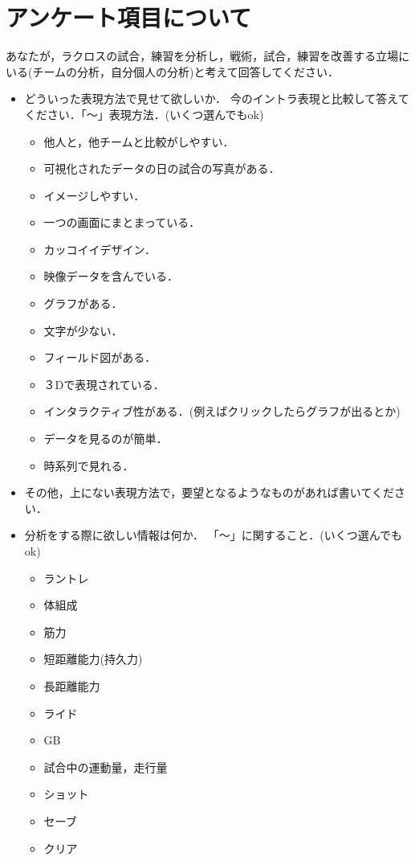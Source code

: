 \documentclass[shuuron]{kuee}
\begin{document}
\chapter{アンケート項目について}
	あなたが，ラクロスの試合，練習を分析し，戦術，試合，練習を改善する立場にいる(チームの分析，自分個人の分析)と考えて回答してください．
	\begin{itemize}
		\item どういった表現方法で見せて欲しいか．
			今のイントラ表現と比較して答えてください．「〜」表現方法．(いくつ選んでもok)
			\begin{itemize}
				\item 他人と，他チームと比較がしやすい．
				\item 可視化されたデータの日の試合の写真がある．
				\item イメージしやすい．
				\item 一つの画面にまとまっている．
				\item カッコイイデザイン．
				\item 映像データを含んでいる．
				\item グラフがある．
				\item 文字が少ない．
				\item フィールド図がある．
				\item ３Dで表現されている．
				\item インタラクティブ性がある．(例えばクリックしたらグラフが出るとか)
				\item データを見るのが簡単．
				\item 時系列で見れる．
			\end{itemize}
		\item その他，上にない表現方法で，要望となるようなものがあれば書いてください．
		\item 分析をする際に欲しい情報は何か．
			「〜」に関すること．(いくつ選んでもok)
			\begin{itemize}
				\item ラントレ
				\item 体組成
				\item 筋力
				\item 短距離能力(持久力)
				\item 長距離能力
				\item ライド
				\item GB
				\item 試合中の運動量，走行量
				\item ショット
				\item セーブ
				\item クリア

\end{itemize}
\end{itemize}
\end{document}
